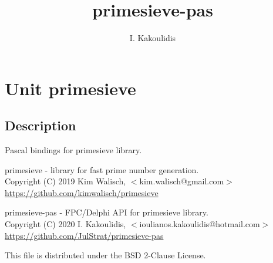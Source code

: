 \documentclass{report}
\begin{document}
\title{primesieve-pas}
\author{I. Kakoulidis}
\maketitle
\newpage
\label{toc}\tableofcontents
\newpage
\newlength{\tmplength}
\chapter{Unit primesieve}
\label{primesieve}
\section{Description}
Pascal bindings for primesieve library.

primesieve {-} library for fast prime number generation.\\{} Copyright (C) 2019 Kim Walisch, {$<$}kim.walisch@gmail.com{$>$}\\{} \href{https://github.com/kimwalisch/primesieve}{https://github.com/kimwalisch/primesieve}

primesieve{-}pas {-} FPC/Delphi API for primesieve library.\\{} Copyright (C) 2020 I. Kakoulidis, {$<$}ioulianos.kakoulidis@hotmail.com{$>$}\\{} \href{https://github.com/JulStrat/primesieve-pas}{https://github.com/JulStrat/primesieve-pas}

This file is distributed under the BSD 2{-}Clause License.
\end{document}

